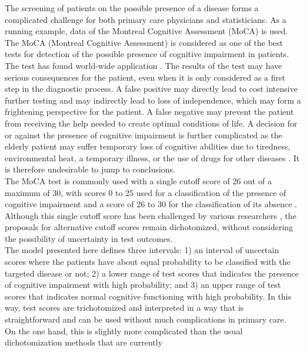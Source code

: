 \documentclass[
  nojss]{jss}
\begin{document}
The screening of patients on the possible presence of a disease forms a
complicated challenge for both primary care physicians and
statisticians. As a running example, data of the Montreal Cognitive
Assessment (MoCA) is used. The MoCA (Montreal Cognitive Assessment) is
considered as one of the best tests for detection of the possible
presence of cognitive impairment in patients. The test has found
world-wide application
\citep{freitas_montreal_2013, larner_screening_2012, martinelli_comparison_2014}.
The results of the test may have serious consequences for the patient,
even when it is only considered as a first step in the diagnostic
process. A false positive may directly lead to cost intensive further
testing and may indirectly lead to loss of independence, which may form
a frightening perspective for the patient. A false negative may prevent
the patient from receiving the help needed to create optimal conditions
of life. A decision for or against the presence of cognitive impairment
is further complicated as the elderly patient may suffer temporary loss
of cognitive abilities due to tiredness, environmental heat, a temporary
illness, or the use of drugs for other diseases
\citep{shiota_temporary_2014}. It is therefore undesirable to jump to
conclusions.\\
The MoCA test is commonly used with a single cutoff score of 26 out of a
maximum of 30, with scores 0 to 25 used for a classification of the
presence of cognitive impairment and a score of 26 to 30 for the
classification of its absence \citep{nasreddine_montreal_2005}. Although
this single cutoff score has been challenged by various researchers
\citep{damian_montreal_2011, davis_montreal_2015, freitas_montreal_2013},
the proposals for alternative cutoff scores remain dichotomized, without
considering the possibility of uncertainty in test outcomes.\\
The model presented here defines three intervals: 1) an interval of
uncertain scores where the patients have about equal probability to be
classified with the targeted disease or not; 2) a lower range of test
scores that indicates the presence of cognitive impairment with high
probability; and 3) an upper range of test scores that indicates normal
cognitive functioning with high probability. In this way, test scores
are trichotomized and interpreted in a way that is straightforward and
can be used without much complications in primary care.\\
On the one hand, this is slightly more complicated than the usual
dichotomization methods \citep{pepe_statistical_2003} that are currently
\end{document}
